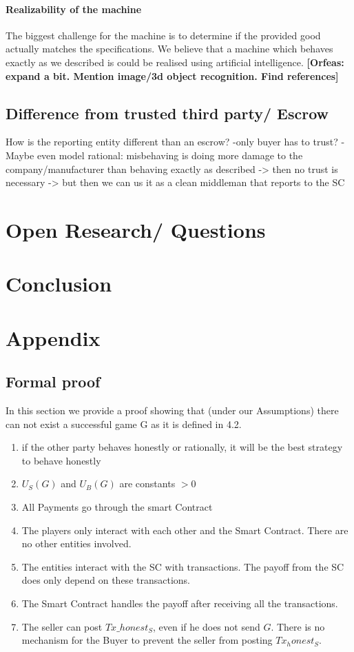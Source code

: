 \documentclass{cacthesis}
\newcommand{\authnote}[3]{{ \footnotesize \textbf{#1[#2: #3]~}}}
\newcommand{\orfnote}[1]{\authnote{\color{blue}}{Orfeas}{#1}}
\begin{document}
\subsubsection{Realizability of the machine} 
The biggest challenge for the machine is to determine if the provided good actually matches the specifications.\newline
We believe that a machine which behaves exactly as we described is could be
realised using artificial intelligence. \orfnote{expand a bit. Mention image/3d
object recognition. Find references}
\section{Difference from trusted third party/ Escrow}
How is the reporting entity different than an escrow?
-only buyer has to trust?
-Maybe even model rational: misbehaving is doing more damage to the company/manufacturer than behaving exactly as described -> then no trust is necessary -> but then we can us it as a clean middleman that reports to the SC
\chapter{Open Research/ Questions}

\chapter{Conclusion}

\chapter{Appendix}

\section{Formal proof}
\label{sec:formal-proof}
In this section we provide a proof showing that (under our Assumptions) there can not exist  a successful game G as it is defined in 4.2.

\begin{enumerate}
    \item if the other party behaves honestly or rationally, it will be the best strategy to behave honestly
    \item $U_S(G)$ and $U_B(G)$ are constants $> 0$
    \item All Payments go through the smart Contract
    \item The players only interact with each other and the Smart Contract. There are no other entities involved.
    \item The entities interact with the SC with transactions. The payoff from the SC does only depend on these transactions.
    \item The Smart Contract handles the payoff after receiving all the transactions.
    \item The seller can post $Tx\_honest_S$, even if he does not send $G$. There is no mechanism for the Buyer to prevent the seller from posting $Tx_honest_S$.

\end{enumerate}
\end{document}
